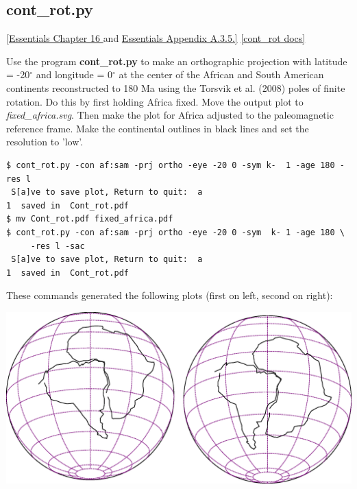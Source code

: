 \documentclass[11pt]{book}
\begin{document}
{{


\subsection{cont\_rot.py}
\href{http://earthref.org/MAGIC/books/Tauxe/Essentials/WebBook3ch16.html#ch16}{[Essentials Chapter 16 }and \href{http://earthref.org/MAGIC/books/Tauxe/Essentials/WebBook3ap1.html#polerot}{Essentials Appendix A.3.5.]}
\href{https://github.com/PmagPy/PmagPy/blob/master/programs/cont_rot.py}{[cont\_rot docs]}

Use the program {\bf cont\_rot.py} to make an orthographic projection with latitude = -20$^{\circ}$ and longitude = 0$^{\circ}$ at the center of the African and South American  continents reconstructed to 180 Ma using the Torsvik et al. (2008) poles of finite rotation.  \nocite{torsvik08} Do this by first holding Africa fixed.  Move the output plot to {\it fixed\_africa.svg}.  Then make the plot for Africa adjusted  to the paleomagnetic reference frame.  Make the continental outlines in black lines and set the resolution to 'low'.

\begin{verbatim}
$ cont_rot.py -con af:sam -prj ortho -eye -20 0 -sym k-  1 -age 180 -res l
 S[a]ve to save plot, Return to quit:  a
1  saved in  Cont_rot.pdf
$ mv Cont_rot.pdf fixed_africa.pdf
$ cont_rot.py -con af:sam -prj ortho -eye -20 0 -sym  k- 1 -age 180 \
     -res l -sac
 S[a]ve to save plot, Return to quit:  a
1  saved in  Cont_rot.pdf
\end{verbatim}

These commands generated the following plots (first on left, second on right):

{%
\hskip 1cm %
\includegraphics[width=15cm]{EPSfiles/controt.eps}}

}}
\end{document}
